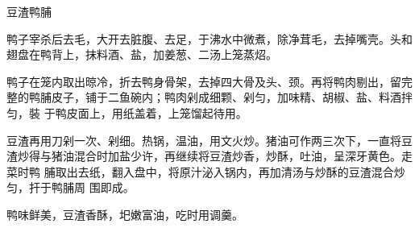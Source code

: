 \begin{recipe}{豆渣鸭脯}

\ingredients



\preparation

\step 鸭子宰杀后去毛，大开去脏腹、去足，于沸水中微煮，除净茸毛，去掉嘴壳。头和
翅盘在鸭背上，抹料酒、盐，加姜葱、二汤上笼蒸炤。

\step 鸭子在笼内取出晾冷，折去鸭身骨架，去掉四大骨及头、颈。再将鸭肉剔出，留完
整的鸭脯皮子，铺于二鱼碗内；鸭肉剁成细颗、剁匀，加味精、胡椒、盐、料酒拌匀，裝
于鸭皮面上，用纸盖着，上笼馏起待用。

\step 豆渣再用刀剁一次、剁细。热锅，温油，用文火炒。猪油可作两三次下，一直将豆
渣炒得与猪油混合时加盐少许，再继续将豆渣炒香，炒酥，吐油，呈深牙黄色。走菜时鸭
脯取出去纸，翻入盘中，将原汁泌入锅内，再加清汤与炒酥的豆渣混合炒匀，扞于鸭脯周
围即成。

\features

鸭味鲜美，豆渣香酥，圯嫩富油，吃时用调羹。

\end{recipe}

